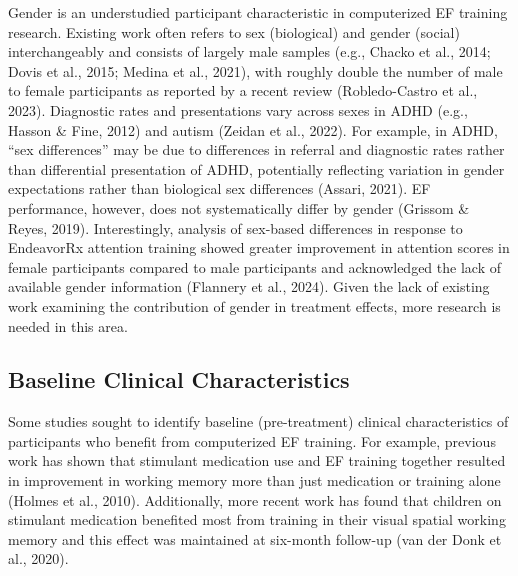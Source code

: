\documentclass[
  letterpaper,
]{ut-thesis}
\begin{document}
Gender is an understudied participant characteristic in computerized EF
training research. Existing work often refers to sex (biological) and
gender (social) interchangeably and consists of largely male samples
(e.g., Chacko et al., 2014; Dovis et al., 2015; Medina et al., 2021),
with roughly double the number of male to female participants as
reported by a recent review (Robledo-Castro et al., 2023). Diagnostic
rates and presentations vary across sexes in ADHD (e.g., Hasson \& Fine,
2012) and autism (Zeidan et al., 2022). For example, in ADHD, ``sex
differences'' may be due to differences in referral and diagnostic rates
rather than differential presentation of ADHD, potentially reflecting
variation in gender expectations rather than biological sex differences
(Assari, 2021). EF performance, however, does not systematically differ
by gender (Grissom \& Reyes, 2019). Interestingly, analysis of sex-based
differences in response to EndeavorRx attention training showed greater
improvement in attention scores in female participants compared to male
participants and acknowledged the lack of available gender information
(Flannery et al., 2024). Given the lack of existing work examining the
contribution of gender in treatment effects, more research is needed in
this area.

\subsection{Baseline Clinical
Characteristics}\label{baseline-clinical-characteristics}

Some studies sought to identify baseline (pre-treatment) clinical
characteristics of participants who benefit from computerized EF
training. For example, previous work has shown that stimulant medication
use and EF training together resulted in improvement in working memory
more than just medication or training alone (Holmes et al., 2010).
Additionally, more recent work has found that children on stimulant
medication benefited most from training in their visual spatial working
memory and this effect was maintained at six-month follow-up (van der
Donk et al., 2020).
\end{document}
